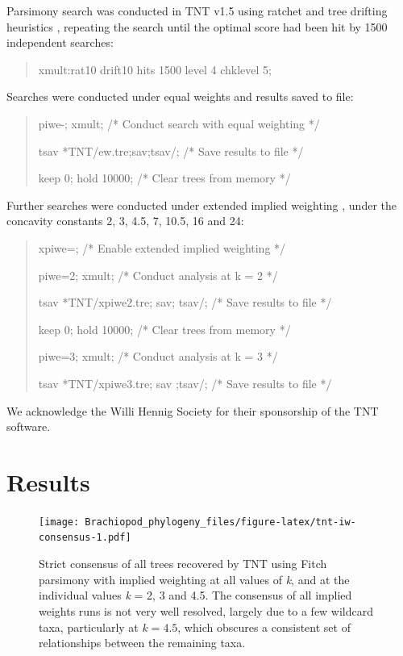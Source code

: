 \documentclass[openany]{book}
\theoremstyle{definition}
\theoremstyle{definition}
\theoremstyle{definition}
\theoremstyle{remark}
\begin{document}
Parsimony search was conducted in TNT v1.5 \citep{Goloboff2016} using
ratchet and tree drifting heuristics \citep{Goloboff1999, Nixon1999},
repeating the search until the optimal score had been hit by 1500
independent searches:

\begin{quote}
xmult:rat10 drift10 hits 1500 level 4 chklevel 5;
\end{quote}

Searches were conducted under equal weights and results saved to file:

\begin{quote}
piwe-; xmult; {/* Conduct search with equal weighting */}

tsav *TNT/ew.tre;sav;tsav/; {/* Save results to file */}

keep 0; hold 10000; {/* Clear trees from memory */}
\end{quote}

Further searches were conducted under extended implied weighting
\citep{Goloboff1997, Goloboff2014}, under the concavity constants 2, 3,
4.5, 7, 10.5, 16 and 24:

\begin{quote}
xpiwe=; {/* Enable extended implied weighting */}

piwe=2; xmult; {/* Conduct analysis at k = 2 */}

tsav *TNT/xpiwe2.tre; sav; tsav/; {/* Save results to file */}

keep 0; hold 10000; {/* Clear trees from memory */}

piwe=3; xmult; {/* Conduct analysis at k = 3 */}

tsav *TNT/xpiwe3.tre; sav ;tsav/; {/* Save results to file */}
\end{quote}

We acknowledge the Willi Hennig Society for their sponsorship of the TNT
software.

\section{Results}\label{results-1}









\begin{figure}
\centering
\texttt{[image: Brachiopod\_phylogeny\_files/figure-latex/tnt-iw-consensus-1.pdf]}
\caption{\label{fig:tnt-iw-consensus}Strict consensus of all trees recovered by TNT
using Fitch parsimony with implied weighting at all values of \emph{k}, and at the individual
values \emph{k} = 2, 3 and 4.5.
The consensus of all implied weights runs is
not very well resolved, largely due to a few wildcard taxa, particularly
at \(k = 4.5\), which obscures a consistent set of relationships between
the remaining taxa.}
\end{figure}
\end{document}
